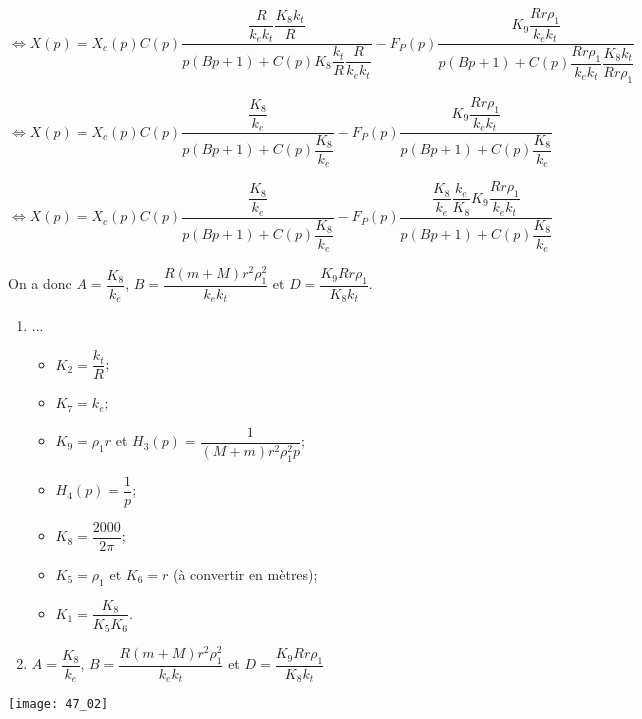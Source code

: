$\Leftrightarrow X(p)
=
X_c(p) C(p)\dfrac{
\dfrac{R}{k_ek_t}\dfrac{K_8k_t}{R}}{
p\left(B p +  1\right) 
 + C(p)K_8 \dfrac{k_t}{R} \dfrac{R}{k_ek_t}
 }
- F_P(p)\dfrac{K_9\dfrac{Rr\rho_1}{  k_ek_t}}{
p\left(
B  p
 + 1\right)
 + C(p)\dfrac{Rr\rho_1}{  k_ek_t}\dfrac{ K_8 k_t}{Rr\rho_1 } }
$

$\Leftrightarrow X(p)
=
X_c(p) C(p)\dfrac{
\dfrac{K_8}{k_e}}{
p\left(B p +  1\right) 
 + C(p) \dfrac{K_8 }{k_e}
 }
- F_P(p)\dfrac{K_9\dfrac{Rr\rho_1}{  k_ek_t}}{
p\left(
B  p
 + 1\right)
 + C(p)\dfrac{K_8}{  k_e} }
$



$\Leftrightarrow X(p)
=
X_c(p) C(p)\dfrac{
\dfrac{K_8}{k_e}}{
p\left(B p +  1\right) 
 + C(p) \dfrac{K_8 }{k_e}
 }
- F_P(p)\dfrac{ \dfrac{K_8}{  k_e} \dfrac{  k_e}{K_8}K_9\dfrac{Rr\rho_1}{  k_ek_t}}{
p\left(
B  p
 + 1\right)
 + C(p)\dfrac{K_8}{  k_e} }
$



On a donc $A=\dfrac{K_8}{k_e}$, $B=\dfrac{R\left(m+M\right)r^2\rho_1^2}{k_ek_t}$ et 
$D = \dfrac{ K_9 Rr\rho_1}{  K_8k_t}$.
\else
\fi

\ifprof
\else
\ifcolle
\else
\begin{solution}
\begin{enumerate}
\item ...
\begin{itemize}
\item $K_2 = \dfrac{k_t}{R}$;
\item $K_7 = k_e$;
\item $K_9 = \rho_1 r$ et $H_3(p)=\dfrac{1}{\left(M+m\right)r^2\rho_1^2 p}$;
\item $H_4(p)=\dfrac{1}{p}$; 
\item $K_8  = \dfrac{2000}{2\pi}$;
\item $K_5=\rho_1$ et $K_6=r$ (à convertir en mètres);
\item $K_1 =\dfrac{K_8}{K_5 K_6}$.
\end{itemize}
\item $A=\dfrac{K_8}{k_e}$, $B=\dfrac{R\left(m+M\right)r^2\rho_1^2}{k_ek_t}$ et 
$D = \dfrac{ K_9 Rr\rho_1}{  K_8k_t}$
\end{enumerate}
\end{solution}
\fi
\begin{marginfigure}
\centering
\texttt{[image: 47\_02]}
\end{marginfigure}
\fi







\ifprof
\else


\fi